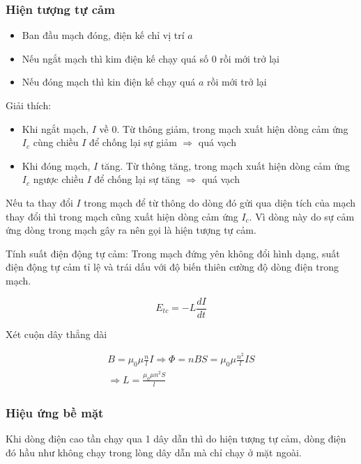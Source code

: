 \subsubsection{Hiện tượng tự cảm}

\begin{itemize}
  \item Ban đầu mạch đóng, điện kế chỉ vị trí $a$
  \item Nếu ngắt mạch thì kim điện kế chạy quá số $0$ rồi mới trở lại
  \item Nếu đóng mạch thì kin điện kế chạy quá $a$ rồi mới trở lại
\end{itemize}

Giải thích:

\begin{itemize}
  \item Khi ngắt mạch, $I$ về 0. Từ thông giảm, trong mạch xuất hiện dòng cảm ứng $I_c$ cùng chiều $I$ để chống lại sự giảm $\Rightarrow$ quá vạch
  \item Khi đóng mạch, $I$ tăng. Từ thông tăng, trong mạch xuất hiện dòng cảm ứng $I_c$ ngược chiều $I$ để chống lại sự tăng $\Rightarrow$ quá vạch
\end{itemize}

Nếu ta thay đổi $I$ trong mạch để từ thông do dòng đó gửi qua diện tích của mạch thay đổi thì trong mạch cũng xuất hiện dòng cảm ứng $I_c$. Vì dòng này do sự cảm ứng dòng trong mạch gây ra nên gọi là hiện tượng tự cảm.

Tính suất điện động tự cảm: Trong mạch đứng yên không đổi hình dạng, suất điện động tự cảm tỉ lệ và trái dấu với độ biến thiên cường độ dòng điện trong mạch.

\begin{equation*}
  E_{tc} = -L\frac{dI}{dt}
\end{equation*}

Xét cuộn dây thẳng dài 

\begin{gather*}
  B = \mu_0\mu \frac{n}{l}I \Rightarrow \Phi = nBS = \mu_0\mu \frac{n^2}{l} IS \\
  \Rightarrow L = \frac{\mu_0\mu n^2 S}{l}
\end{gather*}

\subsubsection{Hiệu ứng bề mặt}

Khi dòng điện cao tần chạy qua 1 dây dẫn thì do hiện tượng tự cảm, dòng điện đó hầu như không chạy trong lòng dây dẫn mà chỉ chạy ở mặt ngoài.

